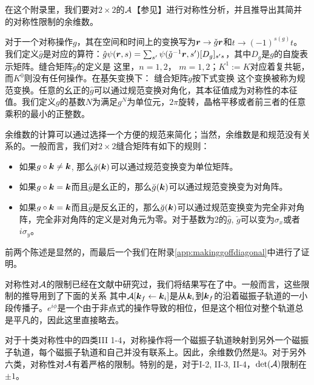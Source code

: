 在这个附录里，我们要对$2\times 2$的${\cal A}$【参见】进行对称性分析，并且推导出其简并的对称性限制的余维数。

对于一个对称操作$g$，其在空间和时间上的变换写为$\boldsymbol{r} \rightarrow \check{g} \boldsymbol{r}$和$t\rightarrow (-1)^{s(g)}t$。我们定义$\hat{g}$是对应的算符：$\hat{g} \psi(\boldsymbol{r},s)=\sum_{s'}\psi(\check{g}^{-1} \boldsymbol{r},s')[D_g]_{s's}$，其中$D_g$是$g$的自旋表示矩阵。缝合矩阵$\breve{g}$的定义是
这里，$n=1,2$， $m=1,2$；$K^1:=K$对应着复共轭，而$K^0$则没有任何操作。在基矢变换下： 
缝合矩阵$\breve{g}$按下式变换
这个变换被称为规范变换。任意的幺正的$\hat{g}$可以通过规范变换对角化，其本征值成为对称性的本征值。我们定义$g$的基数$N$为满足$g^N$为单位元，$2\pi$旋转，晶格平移或者前三者的任意乘积的最小的正整数。

余维数的计算可以通过选择一个方便的规范来简化；当然，余维数是和规范没有关系的。一般而言，我们对$2\times 2$缝合矩阵有如下的规则：
\begin{itemize}
\item 如果$g\circ\boldsymbol{k}\ne\boldsymbol{k}$, 那么$\breve{g}(\boldsymbol{k})$可以通过规范变换变为单位矩阵。
\item 如果$g\circ\boldsymbol{k}=\boldsymbol{k}$而且$\hat{g}$是幺正的，那么$\breve{g}(\boldsymbol{k})$可以通过规范变换变为对角阵。
\item 如果$g\circ\boldsymbol{k}=\boldsymbol{k}$而且$\hat{g}$是反幺正的，那么$\breve{g}(\boldsymbol{k})$可以通过规范变换变为完全非对角阵，完全非对角阵的定义是对角元为零。对于基数为2的$\hat{g}$, $\breve{g}$可以变为$\sigma_x$或者$i\sigma_y$。
\end{itemize}
前两个陈述是显然的，而最后一个我们在附录\ref{app:makinggoffdiagonal}中进行了证明。

对称性对${\cal A}$的限制已经在文献中研究过，我们将结果写在了中。一般而言，这些限制的推导用到了下面的关系
其中${\cal A}[\boldsymbol{k}_f\leftarrow \boldsymbol{k}_i]$是从$\boldsymbol{k}_i$到$\boldsymbol{k}_f$的沿着磁振子轨道的一小段传播子。$e^{i\phi}$是一个由于非点式的操作导致的相位，但是这个相位对整个轨道总是平凡的\cite{100p}，因此这里直接略去。

对于十类对称性中的四类III 1-4，对称操作将一个磁振子轨道映射到另外一个磁振子轨道，每个磁振子轨道和自己并没有联系上。因此，余维数仍然是3。对于另外六类，对称性对${\cal A}$有着严格的限制。特别的是，对于I-2, II-3, II-4，$\det({\cal A})$限制在$\pm 1$\cite{topoferm,100p}。

